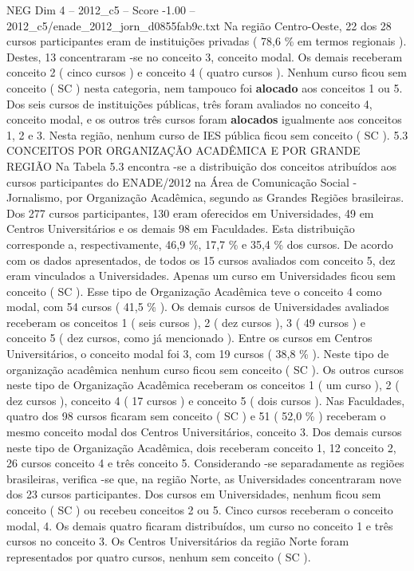 \begin{textsample}{NEG Dim 4 – 2012\_c5 – Score -1.00 – 2012\_c5/enade\_2012\_jorn\_d0855fab9c.txt}
Na região Centro-Oeste, 22 dos 28 cursos participantes eram de instituições privadas ( 78,6 \% em termos regionais ).
Destes, 13 concentraram -se no conceito 3, conceito modal.
Os demais receberam conceito 2 ( cinco cursos ) e conceito 4 ( quatro cursos ).
Nenhum curso ficou sem conceito ( SC ) nesta categoria, nem tampouco foi \textbf{alocado} aos conceitos 1 ou 5.
Dos seis cursos de instituições públicas, três foram avaliados no conceito 4, conceito modal, e os outros três cursos foram \textbf{alocados} igualmente aos conceitos 1, 2 e 3.
Nesta região, nenhum curso de IES pública ficou sem conceito ( SC ). 5.3 CONCEITOS POR ORGANIZAÇÃO ACADÊMICA E POR GRANDE REGIÃO Na Tabela 5.3 encontra -se a distribuição dos conceitos atribuídos aos cursos participantes do ENADE/2012 na Área de Comunicação Social - Jornalismo, por Organização Acadêmica, segundo as Grandes Regiões brasileiras.
Dos 277 cursos participantes, 130 eram oferecidos em Universidades, 49 em Centros Universitários e os demais 98 em Faculdades.
Esta distribuição corresponde a, respectivamente, 46,9 \%, 17,7 \% e 35,4 \% dos cursos.
De acordo com os dados apresentados, de todos os 15 cursos avaliados com conceito 5, dez eram vinculados a Universidades.
Apenas um curso em Universidades ficou sem conceito ( SC ).
Esse tipo de Organização Acadêmica teve o conceito 4 como modal, com 54 cursos ( 41,5 \% ).
Os demais cursos de Universidades avaliados receberam os conceitos 1 ( seis cursos ), 2 ( dez cursos ), 3 ( 49 cursos ) e conceito 5 ( dez cursos, como já mencionado ).
Entre os cursos em Centros Universitários, o conceito modal foi 3, com 19 cursos ( 38,8 \% ).
Neste tipo de organização acadêmica nenhum curso ficou sem conceito ( SC ).
Os outros cursos neste tipo de Organização Acadêmica receberam os conceitos 1 ( um curso ), 2 ( dez cursos ), conceito 4 ( 17 cursos ) e conceito 5 ( dois cursos ).
Nas Faculdades, quatro dos 98 cursos ficaram sem conceito ( SC ) e 51 ( 52,0 \% ) receberam o mesmo conceito modal dos Centros Universitários, conceito 3.
Dos demais cursos neste tipo de Organização Acadêmica, dois receberam conceito 1, 12 conceito 2, 26 cursos conceito 4 e três conceito 5.
Considerando -se separadamente as regiões brasileiras, verifica -se que, na região Norte, as Universidades concentraram nove dos 23 cursos participantes.
Dos cursos em Universidades, nenhum ficou sem conceito ( SC ) ou recebeu conceitos 2 ou 5.
Cinco cursos receberam o conceito modal, 4.
Os demais quatro ficaram distribuídos, um curso no conceito 1 e três cursos no conceito 3.
Os Centros Universitários da região Norte foram representados por quatro cursos, nenhum sem conceito ( SC ).

\end{textsample}

